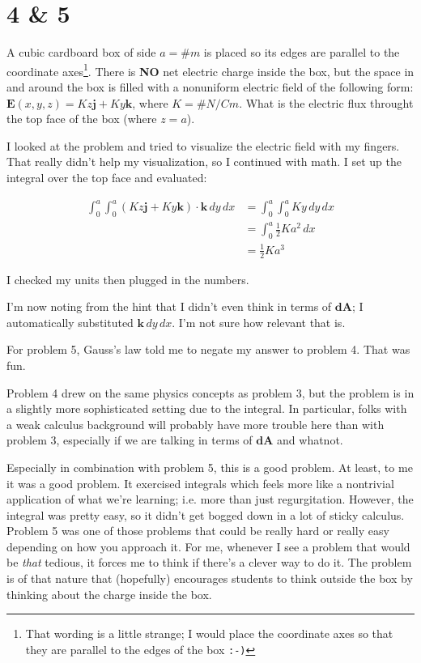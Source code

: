 \documentclass[11pt]{article}
\begin{document}
\section*{4 \& 5}

A cubic cardboard box of side $a = \# m$ is placed so its edges are
parallel to the coordinate axes\footnote{That wording is a little
strange; I would place the coordinate axes so that they are parallel to
the edges of the box \texttt{:-)}}.  There is \textbf{NO} net electric
charge inside the box, but the space in and around the box is filled
with a nonuniform electric field of the following form:
$\mathbf{E}(x,y,z) = Kz\mathbf{j} + Ky\mathbf{k}$, where $K = \# N/Cm$.
What is the electric flux throught the top face of the box (where $z =
a$).

I looked at the problem and tried to visualize the electric field with
my fingers.  That really didn't help my visualization, so I continued
with math.  I set up the integral over the top face and evaluated:

\begin{align*}
\int_0^a\int_0^a{(Kz\mathbf{j} + Ky\mathbf{k})\cdot\mathbf{k}\,dy\,dx}
&= \int_0^a\int_0^a{Ky\,dy\,dx} \\
&= \int_0^a{\frac{1}{2}Ka^2\,dx} \\
&= \frac{1}{2}Ka^3
\end{align*}

I checked my units then plugged in the numbers.

I'm now noting from the hint that I didn't even think in terms of
$\mathbf{dA}$; I automatically substituted $\mathbf{k}\,dy\,dx$.  I'm
not sure how relevant that is.

For problem 5, Gauss's law told me to negate my answer to problem 4.
That was fun.

Problem 4 drew on the same physics concepts as problem 3, but the
problem is in a slightly more sophisticated setting due to the integral.
In particular, folks with a weak calculus background will probably have
more trouble here than with problem 3, especially if we are talking in
terms of $\mathbf{dA}$ and whatnot.

Especially in combination with problem 5, this is a good problem.  At
least, to me it was a good problem.  It exercised integrals which feels
more like a nontrivial application of what we're learning; i.e. more
than just regurgitation.  However, the integral was pretty easy, so it
didn't get bogged down in a lot of sticky calculus.  Problem 5 was one
of those problems that could be really hard or really easy depending on
how you approach it.  For me, whenever I see a problem that would be
\textit{that} tedious, it forces me to think if there's a clever way to
do it.  The problem is of that nature that (hopefully) encourages
students to think outside the box by thinking about the charge inside
the box.
\end{document}
